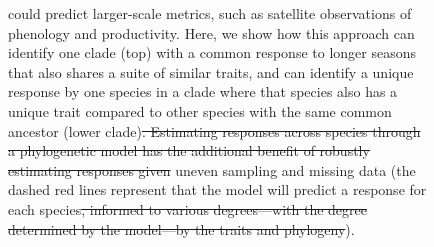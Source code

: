 \documentclass[11pt]{article}
\providecommand{\DIFaddtex}[1]{{\protect\color{blue}\uwave{#1}}} %
\providecommand{\DIFdeltex}[1]{{\protect\color{red}\sout{#1}}}                      %
\providecommand{\DIFaddFL}[1]{\DIFadd{#1}} %
\providecommand{\DIFdelFL}[1]{\DIFdel{#1}} %
\providecommand{\DIFaddbeginFL}{} %
\providecommand{\DIFaddendFL}{} %
\providecommand{\DIFdelbeginFL}{} %
\providecommand{\DIFdelendFL}{} %
\providecommand{\DIFadd}[1]{\texorpdfstring{\DIFaddtex{#1}}{#1}} %
\providecommand{\DIFdel}[1]{\texorpdfstring{\DIFdeltex{#1}}{}} %
\newcommand{\DIFscaledelfig}{0.5}
\newlength{\DIFdelgraphicswidth} %
\newlength{\DIFdelgraphicsheight} %
\newcommand{\DIFaddincludegraphics}[2][]{{\color{blue}\fbox{\DIFOincludegraphics[#1]{#2}}}} %
\newcommand{\DIFdelincludegraphics}[2][]{%
\sbox{\DIFdelgraphicsbox}{\DIFOincludegraphics[#1]{#2}}%
\settoboxwidth{\DIFdelgraphicswidth}{\DIFdelgraphicsbox} %
\settoboxtotalheight{\DIFdelgraphicsheight}{\DIFdelgraphicsbox} %
\scalebox{\DIFscaledelfig}{%
\parbox[b]{\DIFdelgraphicswidth}{\usebox{\DIFdelgraphicsbox}\\[-\baselineskip] \rule{\DIFdelgraphicswidth}{0em}}\llap{\resizebox{\DIFdelgraphicswidth}{\DIFdelgraphicsheight}{%
\setlength{\unitlength}{\DIFdelgraphicswidth}%
\begin{picture}(1,1)%
\thicklines\linethickness{2pt} %
{\color[rgb]{1,0,0}\put(0,0){\framebox(1,1){}}}%
{\color[rgb]{1,0,0}\put(0,0){\line( 1,1){1}}}%
{\color[rgb]{1,0,0}\put(0,1){\line(1,-1){1}}}%
\end{picture}%
}\hspace*{3pt}}} %
} %
\DeclareRobustCommand{\DIFaddbeginFL}{\DIFOaddbeginFL \let\includegraphics\DIFaddincludegraphics} %
\DeclareRobustCommand{\DIFaddendFL}{\DIFOaddendFL \let\includegraphics\DIFOincludegraphics} %
\DeclareRobustCommand{\DIFdelbeginFL}{\DIFOdelbeginFL \let\includegraphics\DIFdelincludegraphics} %
\DeclareRobustCommand{\DIFdelendFL}{\DIFOaddendFL \let\includegraphics\DIFOincludegraphics} %
\begin{document}
\begin{figure}[h!]
{{could predict larger-scale metrics, such as satellite observations of phenology and productivity. Here, }\DIFaddendFL we show how this approach can identify one clade (top) with a common response to longer seasons that also shares a suite of similar traits, and can identify a unique response by one species in a clade where that species also has a unique trait compared to other species with the same common ancestor (lower clade)\DIFdelbeginFL \DIFdelFL{. Estimating responses across species through a phylogenetic model has the additional benefit of robustly estimating responses given }\DIFdelendFL \DIFaddbeginFL \DIFaddFL{, while handling }\DIFaddendFL uneven sampling and missing data (the dashed red lines represent that the model will predict a response for each species\DIFdelbeginFL \DIFdelFL{, informed to various degrees---with the degree determined by the model---by the traits and phylogeny}\DIFdelendFL ). }  %
\label{fig:phylomodel}
\end{figure}
\end{document}
